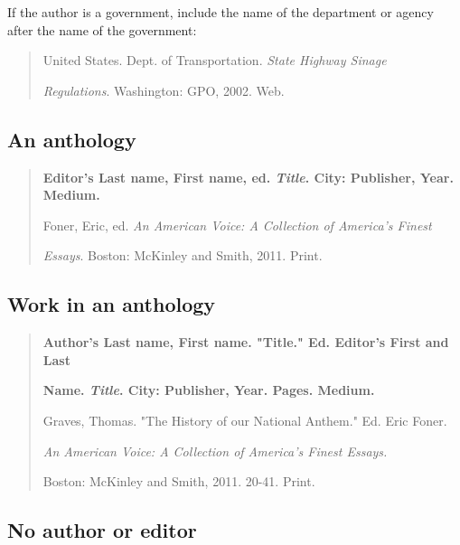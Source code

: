If the author is a government, include the name of the department or agency after the name of the government:
\begin{quote}

United States. Dept. of Transportation. \emph{State Highway Sinage}

\hspace{.4in} \emph{Regulations}. Washington: GPO, 2002. Web.

\end{quote}

\subsection{An anthology}
\begin{quote}

\textbf{Editor's Last name, First name, ed. \emph{Title}. City: Publisher, Year. Medium.}

\medskip

Foner, Eric, ed. \emph{An American Voice: A Collection of America's Finest}

\hspace{.4in}\emph{Essays}. Boston: McKinley and Smith, 2011. Print.

\end{quote}

\subsection{Work in an anthology}

\begin{quote}

\textbf{Author's Last name, First name. "Title." Ed. Editor's First and Last}

\hspace{.4in}\textbf{Name. \emph{Title}. City: Publisher, Year. Pages. Medium.}

\medskip

Graves, Thomas. "The History of our National Anthem." Ed. Eric Foner. 

\hspace{.4in}\emph{An American Voice: A Collection of America's Finest Essays.}

\hspace{.4in}Boston: McKinley and Smith, 2011. 20-41. Print.

\end{quote}

\subsection{No author or editor}

